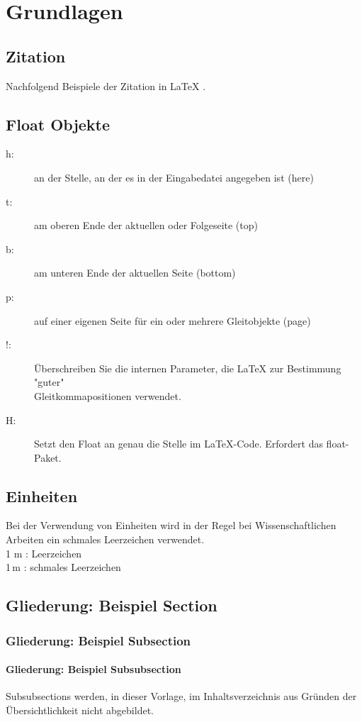 \chapter{Grundlagen}
\label{sec:grundlagen}

\section{Zitation}
Nachfolgend Beispiele der Zitation in {\LaTeX} \cite{yang_application_2003}.
\blindtext
\cite{test}
\blindtext
\cite{kroll_computational_2016, yang_application_2003}


\section{Float Objekte}


\begin{description}
	\item[h:] an der Stelle, an der es in der Eingabedatei angegeben ist (here)
	\item[t:] am oberen Ende der aktuellen oder Folgeseite (top)
	\item[b:] am unteren Ende der aktuellen Seite (bottom)
	\item[p:] auf einer eigenen Seite für ein oder mehrere Gleitobjekte (page)
	\item[!:] Überschreiben Sie die internen Parameter, die LaTeX zur Bestimmung "guter"\\Gleitkommapositionen verwendet.
	\item[H:] Setzt den Float an genau die Stelle im LaTeX-Code. Erfordert das float-Paket.
\end{description}

\section{Einheiten}
Bei der Verwendung von Einheiten wird in der Regel bei Wissenschaftlichen Arbeiten ein schmales Leerzeichen verwendet.\\
1 m : Leerzeichen \\
1\,m : schmales Leerzeichen \\

\section{Gliederung: Beispiel Section}
\subsection{Gliederung: Beispiel Subsection}
\subsubsection{Gliederung: Beispiel Subsubsection}
Subsubsections werden, in dieser Vorlage, im Inhaltsverzeichnis aus Gründen der Übersichtlichkeit nicht abgebildet.